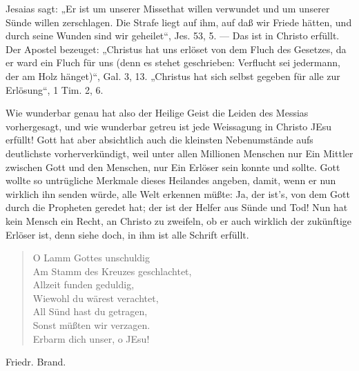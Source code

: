  Jesaias sagt: „Er ist um unserer Missethat willen verwundet und um unserer Sünde willen zerschlagen. Die Strafe liegt auf ihm, auf daß wir Friede hätten, und durch seine Wunden sind wir geheilet“, Jes. 53, 5. — Das ist in Christo erfüllt. Der Apostel bezeuget: „Christus hat uns erlöset von dem Fluch des Gesetzes, da er ward ein Fluch für uns (denn es stehet geschrieben: Verflucht sei jedermann, der am Holz hänget)“, Gal. 3, 13. „Christus hat sich selbst gegeben für alle zur Erlösung“, 1 Tim. 2, 6.

Wie wunderbar genau hat also der Heilige Geist die Leiden des Messias vorhergesagt, und wie wunderbar getreu ist jede Weissagung in Christo JEsu erfüllt! Gott hat aber absichtlich auch die kleinsten Nebenumstände aufs deutlichste vorherverkündigt, weil unter allen Millionen Menschen nur Ein Mittler zwischen Gott und den Menschen, nur Ein Erlöser sein konnte und sollte. Gott wollte so untrügliche Merkmale dieses Heilandes angeben, damit, wenn er nun wirklich ihn senden würde, alle Welt erkennen müßte: Ja, der ist’s, von dem Gott durch die Propheten geredet hat; der ist der Helfer aus Sünde und Tod! Nun hat kein Mensch ein Recht, an Christo zu zweifeln, ob er auch wirklich der zukünftige Erlöser ist, denn siehe doch, in ihm ist alle Schrift erfüllt.

\begin{verse}
O Lamm Gottes unschuldig\\
Am Stamm des Kreuzes geschlachtet,\\
Allzeit funden geduldig,\\
Wiewohl du wärest verachtet,\\
All Sünd hast du getragen,\\
Sonst müßten wir verzagen.\\
Erbarm dich unser, o JEsu!
\end{verse}

Friedr. Brand.
